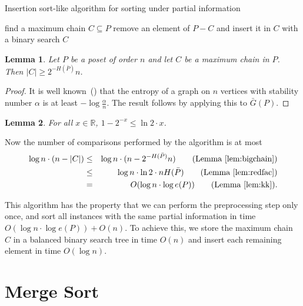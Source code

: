 \documentclass{article} \usepackage{fullpage}
\newtheorem{lemma}{Lemma}
\begin{document}
\begin{algorithm}[ht]
\caption{Insertion sort-like algorithm for sorting under partial information} \label{alg:insertion_sort}
\begin{algorithmic}
\STATE {} 
\STATE find a maximum chain $C\subseteq P$ 
\STATE {}
\STATE remove an element of $P - C$ and insert it in $C$ with a binary search
\ENDWHILE
\RETURN $C$
\end{algorithmic}
\end{algorithm}

\begin{lemma}
\label{lem:bigchain}
Let $P$ be a poset of order $n$ and let $C$ be a maximum chain in $P$. Then $|C| \geq 2^{-H(\bar P)}n$.
\end{lemma}
\begin{proof}
It is well known~(\cite{K86,CFJ07}) that the entropy of a graph on $n$ vertices with stability number $\alpha$ is at least $-\log \frac{\alpha}n$.
The result follows by applying this to $\bar{G}(P)$.
\end{proof}

\begin{lemma}
\label{lem:redfac}
For all $x \in \mathbb{R}$, $1 - 2^{-x} \leq \ln 2 \cdot x$.
\end{lemma}

Now the number of comparisons performed by the algorithm is at most
\begin{eqnarray*}
\log n \cdot (n - |C|) & \leq & \log n \cdot ( n - 2^{-H(\bar P)}n ) \qquad \text{(Lemma~\ref{lem:bigchain})} \\
& \leq & \log n \cdot \ln 2 \cdot n H(\bar P) \qquad \text{(Lemma~\ref{lem:redfac})} \\
& = & O(\log n \cdot \log e(P))\qquad \text{(Lemma~\ref{lem:kk})}.
\end{eqnarray*}

This algorithm has the property that we can perform the preprocessing step only once, and sort all instances with the same partial information in time $O(\log n \cdot \log e(P)) + O(n)$. To achieve this, we store the maximum chain $C$ in a balanced binary search tree in time $O(n)$ and insert each remaining element in time $O(\log n)$.

\section{Merge Sort}
\label{sec:merge}
\end{document}
